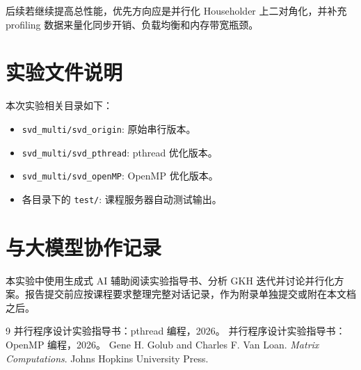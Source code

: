 ﻿\documentclass[UTF8,a4paper]{ctexart}
\begin{document}
后续若继续提高总性能，优先方向应是并行化 Householder 上二对角化，并补充 profiling 数据来量化同步开销、负载均衡和内存带宽瓶颈。

\appendix
\section{实验文件说明}

本次实验相关目录如下：

\begin{itemize}
  \item \texttt{svd\_multi/svd\_origin}: 原始串行版本。
  \item \texttt{svd\_multi/svd\_pthread}: pthread 优化版本。
  \item \texttt{svd\_multi/svd\_openMP}: OpenMP 优化版本。
  \item 各目录下的 \texttt{test/}: 课程服务器自动测试输出。
\end{itemize}

\section{与大模型协作记录}

本实验中使用生成式 AI 辅助阅读实验指导书、分析 GKH 迭代并讨论并行化方案。报告提交前应按课程要求整理完整对话记录，作为附录单独提交或附在本文档之后。

\begin{thebibliography}{9}
 并行程序设计实验指导书：pthread 编程，2026。
 并行程序设计实验指导书：OpenMP 编程，2026。
 Gene H. Golub and Charles F. Van Loan. \textit{Matrix Computations}. Johns Hopkins University Press.
\end{thebibliography}
\end{document}
